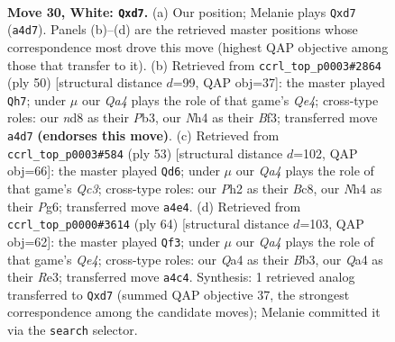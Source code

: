 \documentclass[11pt]{article}
\begin{document}
\clearpage

\begin{figure}[p]\centering
\begin{subfigure}{0.46\textwidth}\centering
\resizebox{\linewidth}{!}{%
\newchessgame
\chessboard[
  setfen={r2n1k2/1p1b1pp1/p7/2q3np/Q6N/4P1P1/PP2RPBP/1R4K1 w - - 0 30},
  showmover=false,
  pgfstyle=straightmove, color=movearrow, markmove={a4-d7}
]}
\caption{}
\end{subfigure}\hfill
\begin{subfigure}{0.46\textwidth}\centering
\resizebox{\linewidth}{!}{%
\newchessgame
\chessboard[
  setfen={1r2nk2/1pqb1pp1/p3p2p/8/P2NQ3/1P2PB1P/5PP1/5RK1 w - - 0 26},
  showmover=false,
  pgfstyle=straightmove, color=movearrow, markmove={e4-h7}
]}
\caption{}
\end{subfigure}
\\[4pt]
\begin{subfigure}{0.46\textwidth}\centering
\resizebox{\linewidth}{!}{%
\newchessgame
\chessboard[
  setfen={2b1r1k1/p1p2p1p/1pq3p1/5n2/2PP1Q2/3B1N2/P4PPP/2R3K1 b - - 0 27},
  showmover=false,
  pgfstyle=straightmove, color=movearrow, markmove={c6-d6}
]}
\caption{}
\end{subfigure}\hfill
\begin{subfigure}{0.46\textwidth}\centering
\resizebox{\linewidth}{!}{%
\newchessgame
\chessboard[
  setfen={1k2r3/pp3pp1/3rp3/2n3q1/4Q1P1/PB2R2P/1PP5/1K2R3 w - - 2 33},
  showmover=false,
  pgfstyle=straightmove, color=movearrow, markmove={e4-f3}
]}
\caption{}
\end{subfigure}
\caption{\textbf{Move 30, White: \texttt{Qxd7}.} (a) Our position; Melanie plays \texttt{Qxd7} (\texttt{a4d7}). Panels (b)--(d) are the retrieved master positions whose correspondence most drove this move (highest QAP objective among those that transfer to it). (b) Retrieved from \texttt{ccrl\_top\_p0003\#2864} (ply 50) [structural distance $d$=99, QAP obj=37]: the master played \texttt{Qh7}; under $\mu$ our \emph{Qa4} plays the role of that game's \emph{Qe4}; cross-type roles: our \emph{n}d8 as their \emph{P}b3, our \emph{N}h4 as their \emph{B}f3; transferred move \texttt{a4d7} \textbf{(endorses this move)}. (c) Retrieved from \texttt{ccrl\_top\_p0003\#584} (ply 53) [structural distance $d$=102, QAP obj=66]: the master played \texttt{Qd6}; under $\mu$ our \emph{Qa4} plays the role of that game's \emph{Qc3}; cross-type roles: our \emph{P}h2 as their \emph{B}c8, our \emph{N}h4 as their \emph{P}g6; transferred move \texttt{a4e4}. (d) Retrieved from \texttt{ccrl\_top\_p0000\#3614} (ply 64) [structural distance $d$=103, QAP obj=62]: the master played \texttt{Qf3}; under $\mu$ our \emph{Qa4} plays the role of that game's \emph{Qe4}; cross-type roles: our \emph{Q}a4 as their \emph{B}b3, our \emph{Q}a4 as their \emph{R}e3; transferred move \texttt{a4c4}. Synthesis: 1 retrieved analog transferred to \texttt{Qxd7} (summed QAP objective 37, the strongest correspondence among the candidate moves); Melanie committed it via the \texttt{search} selector.}
\label{fig:thought-m58}
\end{figure}
\end{document}
